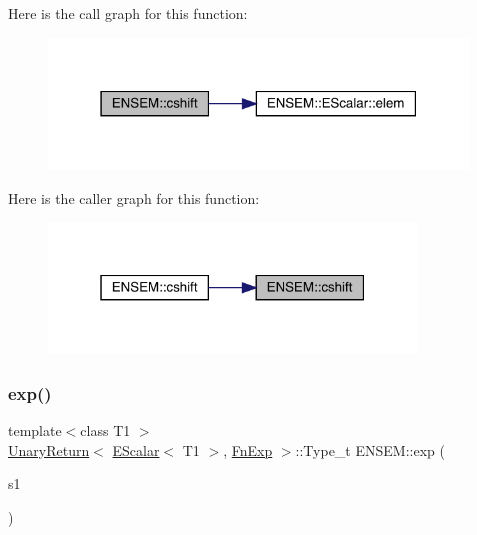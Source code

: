 Here is the call graph for this function\+:
\nopagebreak
\begin{figure}[H]
\begin{center}
\leavevmode
\includegraphics[width=316pt]{d4/dca/group__escalar_ga4a9bfa7287ccf8fef9605aa9e9a44884_cgraph}
\end{center}
\end{figure}
Here is the caller graph for this function\+:
\nopagebreak
\begin{figure}[H]
\begin{center}
\leavevmode
\includegraphics[width=277pt]{d4/dca/group__escalar_ga4a9bfa7287ccf8fef9605aa9e9a44884_icgraph}
\end{center}
\end{figure}
\mbox{\label{group__escalar_ga80b6028648c4f7d8f84f04d129bfa976}} 
\subsubsection{\texorpdfstring{exp()}{exp()}}
{\footnotesize\ttfamily template$<$class T1 $>$ \\
\mbox{\hyperlink{structENSEM_1_1UnaryReturn}{Unary\+Return}}$<$ \mbox{\hyperlink{classENSEM_1_1EScalar}{E\+Scalar}}$<$ T1 $>$, \mbox{\hyperlink{structENSEM_1_1FnExp}{Fn\+Exp}} $>$\+::Type\+\_\+t E\+N\+S\+E\+M\+::exp (\begin{DoxyParamCaption}\item[{const \mbox{\hyperlink{classENSEM_1_1EScalar}{E\+Scalar}}$<$ T1 $>$ \&}]{s1 }\end{DoxyParamCaption})\hspace{0.3cm}{\ttfamily [inline]}}

